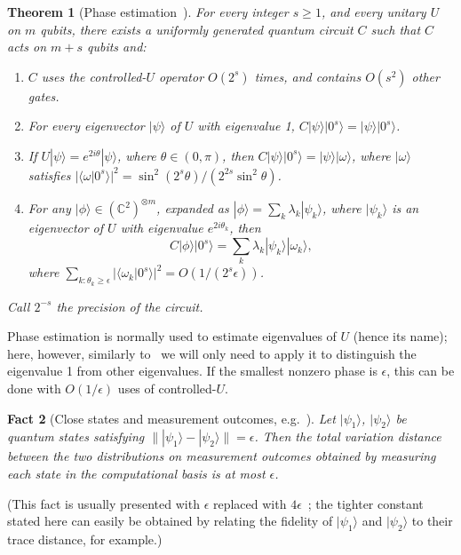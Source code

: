 \documentclass[11pt]{article}
\newcommand{\C}{\mathbb{C}}
\newcommand{\ket}[1]{| #1 \rangle}
\newcommand{\ip}[2]{\langle #1|#2 \rangle}
\newtheorem{thm}{Theorem}
\newtheorem{fact}[thm]{Fact}
\begin{document}
\begin{thm}[Phase estimation~\cite{cleve98a,kitaev95}]
\label{thm:phaseest}
For every integer $s \ge 1$, and every unitary $U$ on $m$ qubits, there exists a uniformly generated quantum circuit $C$ such that $C$ acts on $m + s$ qubits and:
\begin{enumerate}
\item $C$ uses the controlled-$U$ operator $O(2^s)$ times, and contains $O(s^2)$ other gates.
\item For every eigenvector $\ket{\psi}$ of $U$ with eigenvalue 1, $C \ket{\psi}\ket{0^s} = \ket{\psi}\ket{0^s}$.
\item If $U \ket{\psi} = e^{2 i \theta} \ket{\psi}$, where $\theta \in (0,\pi)$, then $C \ket{\psi}\ket{0^s} = \ket{\psi}\ket{\omega}$, where $\ket{\omega}$ satisfies $|\ip{\omega}{0^s}|^2 = \sin^2(2^s \theta) / (2^{2s} \sin^2 \theta)$.
\item For any $\ket{\phi} \in (\C^2)^{\otimes m}$, expanded as $\ket{\phi} = \sum_k \lambda_k \ket{\psi_k}$, where $\ket{\psi_k}$ is an eigenvector of $U$ with eigenvalue $e^{2i\theta_k}$, then
%
\[ C\ket{\phi}\ket{0^s} = \sum_k \lambda_k \ket{\psi_k} \ket{\omega_k}, \]
%
where $\sum_{k: \theta_k \ge \epsilon} |\ip{\omega_k}{0^s}|^2 = O(1/(2^s \epsilon))$.
\end{enumerate}
%
Call $2^{-s}$ the precision of the circuit.
\end{thm}

Phase estimation is normally used to estimate eigenvalues of $U$ (hence its name); here, however, similarly to~\cite{magniez11} we will only need to apply it to distinguish the eigenvalue 1 from other eigenvalues. If the smallest nonzero phase is $\epsilon$, this can be done with $O(1/\epsilon)$ uses of controlled-$U$.

\begin{fact}[Close states and measurement outcomes, e.g.~\cite{bernstein97}]
\label{fact:closestates}
Let $\ket{\psi_1}$, $\ket{\psi_2}$ be quantum states satisfying $\| \ket{\psi_1} - \ket{\psi_2} \| = \epsilon$. Then the total variation distance between the two distributions on measurement outcomes obtained by measuring each state in the computational basis is at most $\epsilon$.
\end{fact}

(This fact is usually presented with $\epsilon$ replaced with $4\epsilon$~\cite{bernstein97}; the tighter constant stated here can easily be obtained by relating the fidelity of $\ket{\psi_1}$ and $\ket{\psi_2}$ to their trace distance, for example.)
\end{document}
